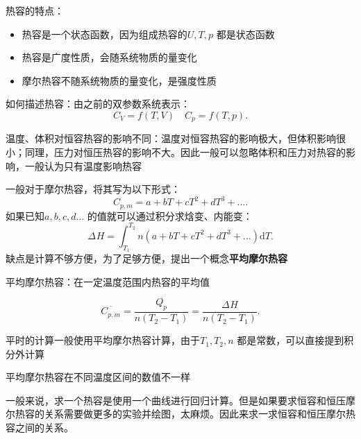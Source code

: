 \begin{notation}
    热容的特点：
    \begin{itemize}
        \item 热容是一个状态函数，因为组成热容的$U,T,p$ 都是状态函数
        \item 热容是广度性质，会随系统物质的量变化
        \item 摩尔热容不随系统物质的量变化，是强度性质
        
    \end{itemize}
\end{notation}
如何描述热容：由之前的双参数系统表示：\[
    C_{V} = f\left( T,V \right)\quad C_{p}=f\left( T,p \right)
.\]
\begin{notation}
    温度、体积对恒容热容的影响不同：温度对恒容热容的影响极大，但体积影响很小；同理，压力对恒压热容的影响不大。因此一般可以忽略体积和压力对热容的影响，一般认为只有温度影响热容
\end{notation}
\begin{notation}
    一般对于摩尔热容，将其写为以下形式：\[
        C_{p,m} = a+bT+cT^2 +dT^3 +\ldots 
    .\]
    如果已知$a,b,c,d\ldots $ 的值就可以通过积分求焓变、内能变：\[
        \Delta_\text{}H = \int_{T_1}^{T_2} n\left( a+bT+cT^2 +dT^3 +\ldots  \right) \mathrm{d}T 
    .\]
    缺点是计算不够方便，为了足够方便，提出一个概念\textbf{平均摩尔热容}
\end{notation}
\begin{defi}
    平均摩尔热容：在一定温度范围内热容的平均值
\end{defi}
\begin{eg}
    \[
        \overline{C_{p,m}} = \frac{Q_{p}}{n\left( T_2-T_1 \right)} = \frac{\Delta_\text{}H }{n\left( T_2-T_1 \right)}
    .\]
\end{eg}
平时的计算一般使用平均摩尔热容计算，由于$T_1,T_2,n$ 都是常数，可以直接提到积分外计算
\begin{notation}
    平均摩尔热容在不同温度区间的数值不一样
\end{notation}
一般来说，求一个热容是使用一个曲线进行回归计算。但是如果要求恒容和恒压摩尔热容的关系需要做更多的实验并绘图，太麻烦。因此来求一求恒容和恒压摩尔热容之间的关系。

